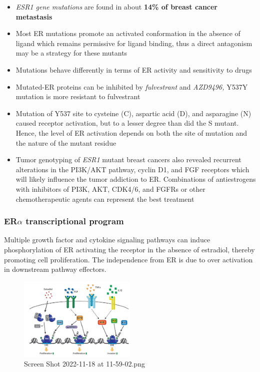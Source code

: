 \begin{itemize}
\tightlist
\item
  \emph{ESR1 gene mutations} are found in about \textbf{14\% of breast cancer metastasis}
\item
  Most ER mutations promote an activated conformation in the absence of ligand which remains
  permissive for ligand binding, thus a direct antagonism may be a strategy for these mutants
\item
  Mutations behave differently in terms of ER activity and sensitivity to drugs
\item
  Mutated-ER proteins can be inhibited by \emph{fulvestrant} and \emph{AZD9496,} Y537Y mutation is more resistant to fulvestrant
\item
  Mutation of Y537 site to cysteine (C), aspartic acid (D), and asparagine (N) caused receptor
  activation, but to a lesser degree than did the S mutant. Hence, the level of ER activation depends on both the site of mutation and the nature of the mutant residue
\item
  Tumor genotyping of \emph{ESR1} mutant breast cancers also revealed recurrent alterations in the
  PI3K/AKT pathway, cyclin D1, and FGF receptors which will likely influence the tumor addiction to ER. Combinations of antiestrogens with inhibitors of PI3K, AKT, CDK4/6, and FGFRs or other chemotherapeutic agents can represent the best treatment
\end{itemize}

\hypertarget{ertranscriptional-program}{%
\subsubsection{\texorpdfstring{ER$\alpha$ transcriptional program}{ERtranscriptional program}}\label{ertranscriptional-program}}

Multiple growth factor and cytokine signaling pathways can induce phosphorylation of ER activating the receptor in the absence of estradiol, thereby promoting cell proliferation. The independence from ER is due to over activation in downstream pathway effectors.

\begin{figure}
\centering
\includegraphics[width=0.5\textwidth]{../_resources/Screen_Shot_2022-11-18_at_11-59-02.png}
\caption{Screen Shot 2022-11-18 at 11-59-02.png}
\end{figure}

